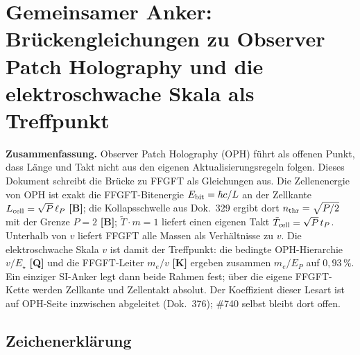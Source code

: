 \providecommand{\BM}{\textbf{[B]}}
\providecommand{\KM}{\textbf{[K]}}
\providecommand{\SM}{\textbf{[S]}}
\providecommand{\XM}{\textbf{[X]}}
\providecommand{\QM}{\textbf{[Q]}}

\chapter*{Gemeinsamer Anker: Brückengleichungen zu Observer Patch Holography und die elektroschwache Skala als Treffpunkt}

{\small\noindent\textbf{Zusammenfassung.}\quad\ignorespaces
Observer Patch Holography (OPH) führt als offenen Punkt, dass Länge und Takt
nicht aus den eigenen Aktualisierungsregeln folgen. Dieses Dokument schreibt
die Brücke zu FFGFT als Gleichungen aus. Die Zellenenergie von OPH ist exakt
die FFGFT-Bitenergie $E_{\rm bit}=\hbar c/L$ an der Zellkante
$L_{\rm cell}=\sqrt P\,\ell_P$ \BM; die Kollapsschwelle aus Dok.~329 ergibt dort
$n_{\rm thr}=\sqrt{P/2}$ mit der Grenze $P=2$ \BM; $\tilde T\cdot m=1$ liefert
einen eigenen Takt $\tilde T_{\rm cell}=\sqrt P\,t_P$. Unterhalb von $v$ liefert FFGFT
alle Massen als Verhältnisse zu $v$. Die elektroschwache Skala $v$ ist damit der
Treffpunkt: die bedingte OPH-Hierarchie $v/E_\star$ \QM{} und die FFGFT-Leiter
$m_e/v$ \KM{} ergeben zusammen $m_e/E_P$ auf $0{,}93\,\%$. Ein einziger
SI-Anker legt dann beide Rahmen fest; über die eigene FFGFT-Kette werden
Zellkante und Zellentakt absolut. Der Koeffizient dieser Lesart ist auf
OPH-Seite inzwischen abgeleitet (Dok.~376); \#740 selbst bleibt dort offen.
}\medskip

\section*{Zeichenerklärung}

\medskip


